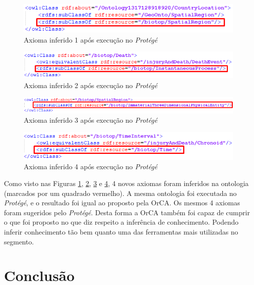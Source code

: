 \documentclass{bcc}
\begin{document}
\begin{figure}[H]
\centering
\includegraphics[width=.7\textwidth]{Figuras/e3_axioma1.png}
\caption{Axioma inferido 1 após execução no \textit{Protégé}} 
\label{fig:e3_axioma1}
\end{figure}
\begin{figure}[H]
\centering
\includegraphics[width=.7\textwidth]{Figuras/e3_axioma2.png}
\caption{Axioma inferido 2 após execução no \textit{Protégé}} 
\label{fig:e3_axioma2}
\end{figure}
\begin{figure}[H]
\centering
\includegraphics[width=.8\textwidth]{Figuras/e3_axioma3.png}
\caption{Axioma inferido 3 após execução no \textit{Protégé}} 
\label{fig:e3_axioma3}
\end{figure}
\begin{figure}[H]
\centering
\includegraphics[width=.7\textwidth]{Figuras/e3_axioma4.png}
\caption{Axioma inferido 4 após execução no \textit{Protégé}} 
\label{fig:e3_axioma4}
\end{figure}

Como visto nas Figuras \ref{fig:e3_axioma1}, \ref{fig:e3_axioma2}, \ref{fig:e3_axioma3} e \ref{fig:e3_axioma4}, 4 novos axiomas foram inferidos na ontologia (marcados por um quadrado vermelho). A mesma ontologia foi executada no \textit{Protégé}, e o resultado foi igual ao proposto pela OrCA. Os mesmos 4 axiomas foram sugeridos pelo \textit{Protégé}. Desta forma a OrCA também foi capaz de cumprir o que foi proposto no que diz respeito a inferência de conhecimento. Podendo inferir conhecimento tão bem quanto uma das ferramentas mais utilizadas no segmento.

\chapter{Conclusão}
\label{chap:conclusao}
\end{document}
